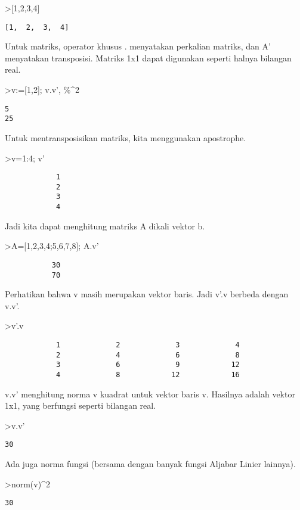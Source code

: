 \documentclass[
]{book}
\begin{document}
\textgreater{[}1,2,3,4{]}

\begin{verbatim}
[1,  2,  3,  4]
\end{verbatim}

Untuk matriks, operator khusus . menyatakan perkalian matriks, dan A' menyatakan transposisi. Matriks 1x1 dapat digunakan seperti halnya bilangan real.

\textgreater v:={[}1,2{]}; v.v', \%\^{}2

\begin{verbatim}
5
25
\end{verbatim}

Untuk mentransposisikan matriks, kita menggunakan apostrophe.

\textgreater v=1:4; v'

\begin{verbatim}
            1 
            2 
            3 
            4 
\end{verbatim}

Jadi kita dapat menghitung matriks A dikali vektor b.

\textgreater A={[}1,2,3,4;5,6,7,8{]}; A.v'

\begin{verbatim}
           30 
           70 
\end{verbatim}

Perhatikan bahwa v masih merupakan vektor baris. Jadi v'.v berbeda dengan v.v'.

\textgreater v'.v

\begin{verbatim}
            1             2             3             4 
            2             4             6             8 
            3             6             9            12 
            4             8            12            16 
\end{verbatim}

v.v' menghitung norma v kuadrat untuk vektor baris v. Hasilnya adalah vektor 1x1, yang berfungsi seperti bilangan real.

\textgreater v.v'

\begin{verbatim}
30
\end{verbatim}

Ada juga norma fungsi (bersama dengan banyak fungsi Aljabar Linier lainnya).

\textgreater norm(v)\^{}2

\begin{verbatim}
30
\end{verbatim}
\end{document}
